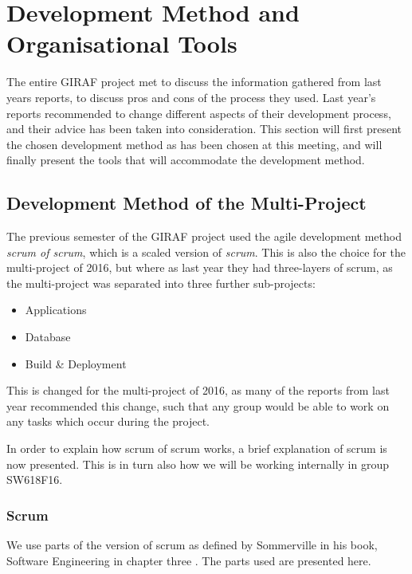 \section{Development Method and Organisational Tools}
The entire GIRAF project met to discuss the information gathered from last years reports, to discuss pros and cons of the process they used.
Last year's reports recommended to change different aspects of their development process, and their advice has been taken into consideration.
This section will first present the chosen development method as has been chosen at this meeting, and will finally present the tools that will accommodate the development method.


\subsection*{Development Method of the Multi-Project}
The previous semester of the GIRAF project used the agile development method \textit{scrum of scrum}, which is a scaled version of \textit{scrum}.
This is also the choice for the multi-project of 2016, but where as last year they had three-layers of scrum, as the multi-project was separated into three further sub-projects:
\begin{itemize}
	\item Applications
	\item Database
	\item Build \& Deployment
\end{itemize}

This is changed for the multi-project of 2016, as many of the reports from last year recommended this change, such that any group would be able to work on any tasks which occur during the project.

In order to explain how scrum of scrum works, a brief explanation of scrum is now presented.
This is in turn also how we will be working internally in group SW618F16. 


\subsubsection*{Scrum}

We use parts of the version of scrum as defined by Sommerville in his book, Software Engineering in chapter three \cite{SEBOOK}.
The parts used are presented here.

